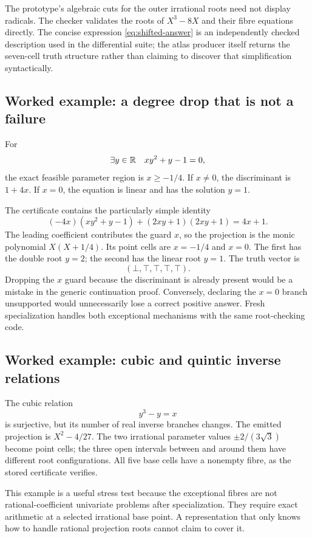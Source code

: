 The prototype's algebraic cuts for the outer irrational roots need not display radicals. The checker validates the roots of $X^3-8X$ and their fibre equations directly. The concise expression \eqref{eq:shifted-answer} is an independently checked description used in the differential suite; the atlas producer itself returns the seven-cell truth structure rather than claiming to discover that simplification syntactically.

\subsection{Worked example: a degree drop that is not a failure}
For
\[
 \exists y\in\mathbb R\quad xy^2+y-1=0,
\]
the exact feasible parameter region is $x\geq-1/4$. If $x\ne0$, the discriminant is $1+4x$. If $x=0$, the equation is linear and has the solution $y=1$.

The certificate contains the particularly simple identity
\begin{equation}\label{eq:quadratic-bezout}
 (-4x)(xy^2+y-1)+(2xy+1)(2xy+1)=4x+1.
\end{equation}
The leading coefficient contributes the guard $x$, so the projection is the monic polynomial $X(X+1/4)$. Its point cells are $x=-1/4$ and $x=0$. The first has the double root $y=2$; the second has the linear root $y=1$. The truth vector is
\[
 (\bot,\top,\top,\top,\top).
\]
Dropping the $x$ guard because the discriminant is already present would be a mistake in the generic continuation proof. Conversely, declaring the $x=0$ branch unsupported would unnecessarily lose a correct positive answer. Fresh specialization handles both exceptional mechanisms with the same root-checking code.

\subsection{Worked example: cubic and quintic inverse relations}
The cubic relation
\[
 y^3-y=x
\]
is surjective, but its number of real inverse branches changes. The emitted projection is $X^2-4/27$. The two irrational parameter values $\pm2/(3\sqrt3)$ become point cells; the three open intervals between and around them have different root configurations. All five base cells have a nonempty fibre, as the stored certificate verifies.

This example is a useful stress test because the exceptional fibres are not rational-coefficient univariate problems after specialization. They require exact arithmetic at a selected irrational base point. A representation that only knows how to handle rational projection roots cannot claim to cover it.

